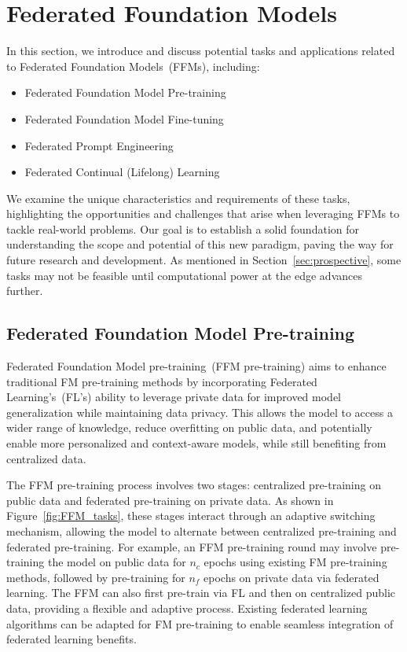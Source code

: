 
\section{Federated Foundation Models}
In this section, we introduce and discuss potential tasks and applications related to Federated Foundation Models~(FFMs), including:
\begin{itemize}
\item Federated Foundation Model Pre-training
\item Federated Foundation Model Fine-tuning
\item Federated Prompt Engineering
\item Federated Continual (Lifelong) Learning
\end{itemize}
We examine the unique characteristics and requirements of these tasks, highlighting the opportunities and challenges that arise when leveraging FFMs to tackle real-world problems. Our goal is to establish a solid foundation for understanding the scope and potential of this new paradigm, paving the way for future research and development. As mentioned in Section~\ref{sec:prospective}, some tasks may not be feasible until computational power at the edge advances further.

\subsection{Federated Foundation Model Pre-training}
Federated Foundation Model pre-training~(FFM pre-training) aims to enhance traditional FM pre-training methods by incorporating Federated Learning's~(FL's) ability to leverage private data for improved model generalization while maintaining data privacy. This allows the model to access a wider range of knowledge, reduce overfitting on public data, and potentially enable more personalized and context-aware models, while still benefiting from centralized data.


The FFM pre-training process involves two stages: centralized pre-training on public data and federated pre-training on private data. As shown in Figure~\ref{fig:FFM_tasks}, these stages interact through an adaptive switching mechanism, allowing the model to alternate between centralized pre-training and federated pre-training.
For example, an FFM pre-training round may involve pre-training the model on public data for $n_c$ epochs using existing FM pre-training methods, followed by pre-training for $n_f$ epochs on private data via federated learning. The FFM can also first pre-train via FL and then on centralized public data, providing a flexible and adaptive process. Existing federated learning algorithms can be adapted for FM pre-training to enable seamless integration of federated learning benefits.

